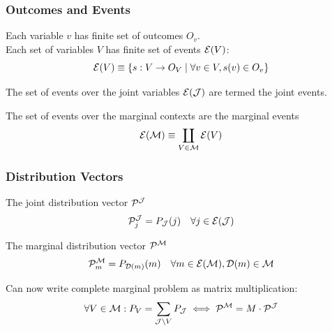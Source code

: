 \documentclass[
    hyperref={bookmarks=false},%
    xcolor={dvipsnames},
]{beamer}
\renewcommand{\term}[1]{\textcolor{Mahogany}{#1}}
\renewcommand{\tcdot}{\cdot} %
\begin{document}
\begin{frame}
    \frametitle{Outcomes and Events}
    \begin{definition}
        Each variable $v$ has finite set of \term{outcomes} $O_v$. \\
        Each set of variables $V$ has finite set of \term{events} $\Events{V}$:
        \[ \Events{V} \defined \bc{s: V \to O_V \mid \forall v \in V, s\br{v} \in O_v} \]
    \end{definition}
    \begin{definition}
        The set of events over the joint variables $\Events{\jointvar}$ are termed the \term{joint events}.
    \end{definition}
    \begin{definition}
        The set of events over the marginal contexts are the \term{marginal events}
        \[ \Events{\mscenario} \defined \coprod_{V \in \mscenario} \Events{V} \]
    \end{definition}
\end{frame}

\begin{frame}
    \frametitle{Distribution Vectors}
    \begin{definition}
        The \term{joint distribution vector} $\probvec^{\jointvar}$
        \[ \probvec^{\jointvar}_j = \prob[\jointvar][j] \quad \forall j \in \Events{\jointvar}\]
    \end{definition}
    \begin{definition}
        The \term{marginal distribution vector} $\probvec^{\mscenario}$
        \[ \probvec^{\mscenario}_m = \prob[\Dom{m}][m] \quad \forall m \in \Events{\mscenario}, \Dom{m} \in \mscenario\]
    \end{definition}
    Can now write complete marginal problem as matrix multiplication:
    \[ \forall V \in \mscenario : \prob[V] = \sum_{\jointvar \setminus V} \prob[\jointvar] \iff \probvec^{\mscenario} = M \tcdot \probvec^{\jointvar} \]
\end{frame}
\end{document}
